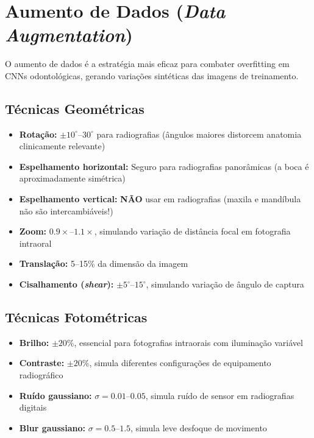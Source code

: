 \section{Aumento de Dados (\textit{Data Augmentation})}
\label{sec:data-augmentation}

O aumento de dados é a estratégia mais eficaz para combater overfitting em CNNs
odontológicas, gerando variações sintéticas das imagens de treinamento.

\subsection{Técnicas Geométricas}

\begin{itemize}
  \item \textbf{Rotação:} $\pm 10^\circ$--$30^\circ$ para radiografias (ângulos
        maiores distorcem anatomia clinicamente relevante)
  \item \textbf{Espelhamento horizontal:} Seguro para radiografias panorâmicas
        (a boca é aproximadamente simétrica)
  \item \textbf{Espelhamento vertical:} \textbf{NÃO} usar em radiografias
        (maxila e mandíbula não são intercambiáveis!)
  \item \textbf{Zoom:} $0.9\times$--$1.1\times$, simulando variação de distância
        focal em fotografia intraoral
  \item \textbf{Translação:} 5--15\% da dimensão da imagem
  \item \textbf{Cisalhamento (\textit{shear}):} $\pm 5^\circ$--$15^\circ$,
        simulando variação de ângulo de captura
\end{itemize}

\subsection{Técnicas Fotométricas}

\begin{itemize}
  \item \textbf{Brilho:} $\pm 20\%$, essencial para fotografias intraorais com
        iluminação variável
  \item \textbf{Contraste:} $\pm 20\%$, simula diferentes configurações de
        equipamento radiográfico
  \item \textbf{Ruído gaussiano:} $\sigma = 0.01$--$0.05$, simula ruído de
        sensor em radiografias digitais
  \item \textbf{Blur gaussiano:} $\sigma = 0.5$--$1.5$, simula leve desfoque
        de movimento
\end{itemize}

